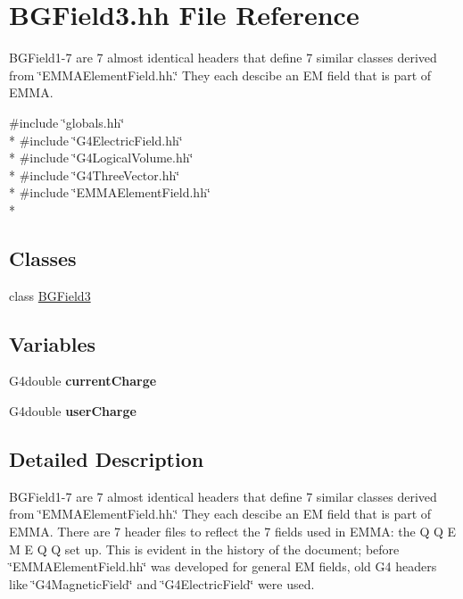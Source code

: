 \hypertarget{BGField3_8hh}{\section{B\-G\-Field3.\-hh File Reference}
\label{BGField3_8hh}
}


B\-G\-Field1-\/7 are 7 almost identical headers that define 7 similar classes derived from \char`\"{}\-E\-M\-M\-A\-Element\-Field.\-hh.\char`\"{} They each descibe an E\-M field that is part of E\-M\-M\-A.  


{\ttfamily \#include \char`\"{}globals.\-hh\char`\"{}}\\*
{\ttfamily \#include \char`\"{}G4\-Electric\-Field.\-hh\char`\"{}}\\*
{\ttfamily \#include \char`\"{}G4\-Logical\-Volume.\-hh\char`\"{}}\\*
{\ttfamily \#include \char`\"{}G4\-Three\-Vector.\-hh\char`\"{}}\\*
{\ttfamily \#include \char`\"{}E\-M\-M\-A\-Element\-Field.\-hh\char`\"{}}\\*
\subsection*{Classes}
\begin{DoxyCompactItemize}
\item 
class \hyperlink{classBGField3}{B\-G\-Field3}
\end{DoxyCompactItemize}
\subsection*{Variables}
\begin{DoxyCompactItemize}
\item 
\hypertarget{BGField3_8hh_acb265d8eecfa1acd31056f0c7915362e}{G4double {\bfseries current\-Charge}}\label{BGField3_8hh_acb265d8eecfa1acd31056f0c7915362e}

\item 
\hypertarget{BGField3_8hh_a2d61cdd1b1b5ed409f7c91b54737c1b9}{G4double {\bfseries user\-Charge}}\label{BGField3_8hh_a2d61cdd1b1b5ed409f7c91b54737c1b9}

\end{DoxyCompactItemize}


\subsection{Detailed Description}
B\-G\-Field1-\/7 are 7 almost identical headers that define 7 similar classes derived from \char`\"{}\-E\-M\-M\-A\-Element\-Field.\-hh.\char`\"{} They each descibe an E\-M field that is part of E\-M\-M\-A. There are 7 header files to reflect the 7 fields used in E\-M\-M\-A\-: the Q Q E M E Q Q set up. This is evident in the history of the document; before \char`\"{}\-E\-M\-M\-A\-Element\-Field.\-hh\char`\"{} was developed for general E\-M fields, old G4 headers like \char`\"{}\-G4\-Magnetic\-Field\char`\"{} and \char`\"{}\-G4\-Electric\-Field\char`\"{} were used. 